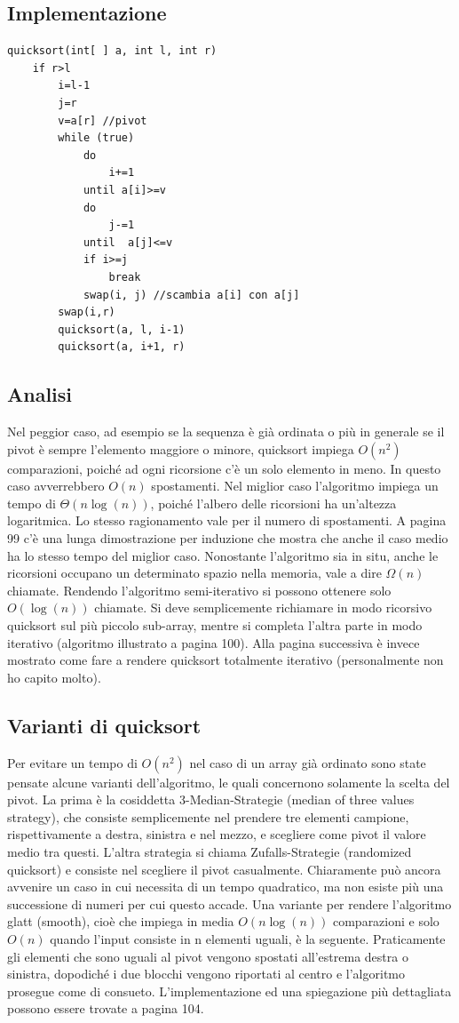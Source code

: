 \documentclass[a4paper]{book}
\begin{document}
\subsection*{Implementazione}

\begin{lstlisting}
quicksort(int[ ] a, int l, int r)
	if r>l
		i=l-1
		j=r
		v=a[r] //pivot
		while (true)
			do
				i+=1
			until a[i]>=v
			do
				j-=1
			until  a[j]<=v
			if i>=j
				break
			swap(i, j) //scambia a[i] con a[j]
	 	swap(i,r)
		quicksort(a, l, i-1)
		quicksort(a, i+1, r)
\end{lstlisting}    
      
\subsection*{Analisi}
Nel peggior caso, ad esempio se la sequenza è già ordinata o più in generale se il pivot è sempre l'elemento maggiore o minore, quicksort impiega $O(n^2)$ comparazioni, poiché ad ogni ricorsione c'è un solo elemento in meno. In questo caso avverrebbero $O(n)$ spostamenti. Nel miglior caso l'algoritmo impiega un tempo di $\Theta (n\log (n))$, poiché l'albero delle ricorsioni ha un'altezza logaritmica. Lo stesso ragionamento vale per il numero di spostamenti. A pagina 99 c'è una lunga dimostrazione per induzione che mostra che anche il caso medio ha lo stesso tempo del miglior caso. Nonostante l'algoritmo sia in situ, anche le ricorsioni occupano un determinato spazio nella memoria, vale a dire $\Omega (n)$ chiamate. Rendendo l'algoritmo semi-iterativo si possono ottenere solo $O(\log (n))$ chiamate. Si deve semplicemente richiamare in modo ricorsivo quicksort sul più piccolo sub-array, mentre si completa l'altra parte in modo iterativo (algoritmo illustrato a pagina 100). Alla pagina successiva è invece mostrato come fare a rendere quicksort totalmente iterativo (personalmente non ho capito molto). 
            
\subsection*{Varianti di quicksort}
Per evitare un tempo di $O(n^2)$ nel caso di un array già ordinato sono state pensate alcune varianti dell'algoritmo, le quali concernono solamente la scelta del pivot. La prima è la cosiddetta 3-Median-Strategie (median of three values strategy), che consiste semplicemente nel prendere tre elementi campione, rispettivamente a destra, sinistra e nel mezzo, e scegliere come pivot il valore medio tra questi.
L'altra strategia si chiama Zufalls-Strategie (randomized quicksort) e consiste nel scegliere il pivot casualmente. Chiaramente può ancora avvenire un caso in cui necessita di un tempo quadratico, ma non esiste più una successione di numeri per cui questo accade. Una variante per rendere l'algoritmo glatt (smooth), cioè che impiega in media $O(n \log (n))$ comparazioni e  solo $O(n)$ quando l'input consiste in n elementi uguali, è la seguente. Praticamente gli elementi che sono uguali al pivot vengono spostati all'estrema destra o sinistra, dopodiché i due blocchi vengono riportati al centro e l'algoritmo prosegue come di consueto. L'implementazione ed una spiegazione più dettagliata possono essere trovate a pagina 104.
\end{document}
